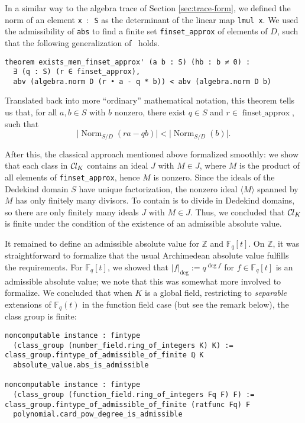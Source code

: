 \documentclass[sn-mathphys]{sn-jnl}%
\newcommand{\lean}[1]{\texttt{#1}\xspace}
\newcommand*{\Cl}{\mathcal{C}\kern-.075em l}
\newcommand*{\Fq}[1][q]{\mathbb{F}_{#1}}
\renewcommand{\Z}{\mathbb{Z}}
\begin{document}
In a similar way to the algebra trace of Section \ref{sec:trace-form}, we defined the norm of an element \lean{x $:$ S} as the determinant of the linear map \lean{lmul x}.
We used the admissibility of \lean{abs} to find a finite set \lean{finset\_approx} of elements of $D$,
such that the following generalization of~\cite[Theorem~12.2.1]{Ireland-Rosen} holds.
\begin{lstlisting}
theorem exists_mem_finset_approx' (a b : S) (hb : b ≠ 0) :
  ∃ (q : S) (r ∈ finset_approx),
  abv (algebra.norm D (r • a - q * b)) < abv (algebra.norm D b)
\end{lstlisting}
Translated back into more ``ordinary'' mathematical notation, this theorem tells us that, for all $a, b \in S$ with $b$ nonzero, there exist $q \in S$ and $r \in \operatorname{finset\_approx}$, such that
\[\lvert \operatorname{Norm}_{S/D}(ra-qb)\rvert < \lvert \operatorname{Norm}_{S/D}(b) \rvert.\]

After this, the classical approach mentioned above formalized smoothly:
we show that each class in $\Cl_{K}$ contains an ideal $J$ with $M \in J$,
where $M$ is the product of all elements of \lean{finset\_approx}, hence $M$ is nonzero.
Since the ideals of the Dedekind domain $S$ have unique factorization,
the nonzero ideal $\langle M \rangle$ spanned by $M$ has only finitely many divisors.
To contain is to divide in Dedekind domains, so there are only finitely many ideals $J$ with $M \in J$.
Thus, we concluded that $\Cl_{K}$ is finite under the condition of the existence of an admissible absolute value.

It remained to define an admissible absolute value for $\Z$ and $\Fq[q][t]$. On $\Z$, it was straightforward to formalize that the usual Archimedean absolute value fulfills the requirements. For $\Fq[q][t]$, we showed that $\lvert f\rvert_{\deg}:=q^{\deg f}$ for $f \in \Fq[q][t]$ is an admissible absolute value; we note that this was somewhat more involved to formalize.
We concluded that when $K$ is a global field, restricting to \emph{separable} extensions of $\Fq[q](t)$ in the function field case (but see the remark below), the class group is finite:
\begin{lstlisting}
noncomputable instance : fintype
  (class_group (number_field.ring_of_integers K) K) :=
class_group.fintype_of_admissible_of_finite ℚ K
  absolute_value.abs_is_admissible

noncomputable instance : fintype
  (class_group (function_field.ring_of_integers Fq F) F) :=
class_group.fintype_of_admissible_of_finite (ratfunc Fq) F
  polynomial.card_pow_degree_is_admissible
\end{lstlisting}
\end{document}
